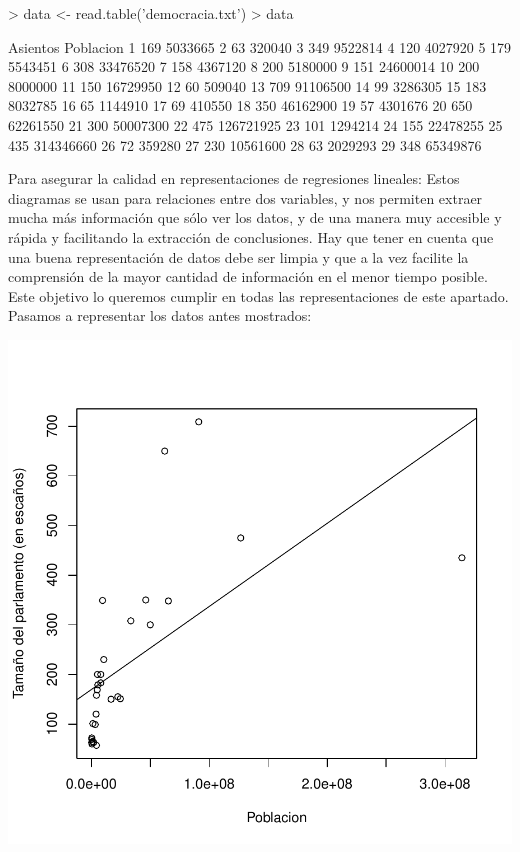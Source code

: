 \documentclass [a4paper] {article}
\begin{document}
\begin{Schunk}
\begin{Sinput}
> data <- read.table('democracia.txt')
> data
\end{Sinput}
\begin{Soutput}
   Asientos Poblacion
1       169   5033665
2        63    320040
3       349   9522814
4       120   4027920
5       179   5543451
6       308  33476520
7       158   4367120
8       200   5180000
9       151  24600014
10      200   8000000
11      150  16729950
12       60    509040
13      709  91106500
14       99   3286305
15      183   8032785
16       65   1144910
17       69    410550
18      350  46162900
19       57   4301676
20      650  62261550
21      300  50007300
22      475 126721925
23      101   1294214
24      155  22478255
25      435 314346660
26       72    359280
27      230  10561600
28       63   2029293
29      348  65349876
\end{Soutput}
\end{Schunk}

Para asegurar la calidad en representaciones de regresiones lineales: Estos diagramas se usan para relaciones entre dos variables, 
y nos permiten extraer mucha más información que sólo ver los datos, y de una manera muy accesible y rápida y facilitando la extracción de 
conclusiones. Hay que tener en cuenta que una buena representación de datos debe ser limpia y que a la vez facilite la comprensión de la 
mayor cantidad de información en el menor tiempo posible. Este objetivo lo queremos cumplir en todas las representaciones de este apartado.
Pasamos a representar los datos antes mostrados:

\begin{center}
\includegraphics{entrega-plot_democracia}
\end{center}
\end{document}
